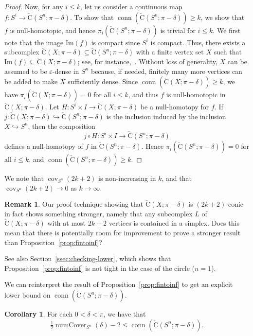 \documentclass[11 pt,a4paper,twoside,reqno]{amsart}
\theoremstyle{definition}
\newtheorem{corollary}[theorem]{Corollary}
\newtheorem{remark}[theorem]{Remark}
\newcommand{\cech}[2]{\mathrm{\check{C}}(#1;#2)}
\DeclareMathOperator{\conn}{conn}
\DeclareMathOperator{\cov}{cov}
\DeclareMathOperator{\numcov}{numCover}
\begin{document}
\begin{proof}
Now, for any $i \le k$, let us consider a continuous map $f\colon S^i \to \cech{S^n}{\pi-\delta}$.
To show that $\conn(\cech{S^n}{\pi-\delta})\ge k$, we show that $f$ is null-homotopic, and hence $\pi_i(\cech{S^n}{\pi-\delta})$ is trivial for $i\le k$.
We first note that the image $\text{Im}(f)$ is compact since $S^i$ is compact.
Thus, there exists a subcomplex $\cech{X}{\pi-\delta} \subseteq \cech{S^n}{\pi-\delta}$ with a finite vertex set $X$ such that $\text{Im}(f)\subseteq \cech{X}{\pi-\delta}$; {see, for instance,~\cite[Proposition~A.1]{Hatcher}.}
Without loss of generality, $X$ can be assumed to be $\varepsilon$-dense in $S^n$ because, if needed, finitely many more vertices can be added to make $X$ sufficiently dense.
Since $\conn(\cech{X}{\pi-\delta})\ge k$, we have $\pi_i(\cech{X}{\pi-\delta}) = 0$ for all $i \le k$, and thus $f$ is null-homotopic in $\cech{X}{\pi-\delta}$.
Let $H\colon S^i\times I \to \cech{X}{\pi-\delta}$ be a null-homotopy for $f$.
If $j\colon \cech{X}{\pi-\delta}\hookrightarrow\cech{S^n}{\pi-\delta}$ is the inclusion induced by the inclusion $X\hookrightarrow S^n$, then the composition
\[
    j \circ H\colon S^i \times I \to \cech{S^n}{\pi-\delta}
\]
defines a null-homotopy of $f$ in $\cech{S^n}{\pi-\delta}$.
Hence $\pi_i(\cech{S^n}{\pi-\delta}) = 0$ for all $i \le k$, and $\conn(\cech{S^n}{\pi-\delta})\ge k$.
\end{proof}

We note that $\cov_{S^n}(2k+2)$ is non-increasing in $k$, and that $\cov_{S^n}(2k+2)\to 0$ as $k\to \infty$.

\begin{remark}
Our proof technique showing that $\cech{X}{\pi-\delta}$ is $(2k+2)$-conic in fact shows something stronger, namely that any subcomplex $L$ of $\cech{X}{\pi-\delta}$ with at most $2k+2$ vertices is contained in a simplex.
Does this mean that there is potentially room for improvement to prove a stronger result than Proposition~\ref{prop:fintoinf}?

See also Section~\ref{ssec:checking-lower}, which shows that Proposition~\ref{prop:fintoinf} is not tight in the case of the circle ($n=1$).
\end{remark}

We can reinterpret the result of Proposition~\ref{prop:fintoinf} to get an explicit lower bound on $\conn(\cech{S^n}{\pi-\delta})$.

\begin{corollary}
\label{cor:lowerbound2}
For each $0<\delta <\pi$, we have that 
\[
\tfrac{1}{2}\numcov_{S^n}(\delta) - 2 \le \conn(\cech{S^n}{\pi-\delta}).
\]
\end{corollary}
\end{document}
